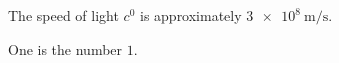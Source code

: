 \documentclass[preview]{standalone}
\begin{document}
The speed of light $\si{\clight}$ is approximately $\SI{3e8}{\meter\per\second}$.

One is the number $\num{1}$.
\end{document}
